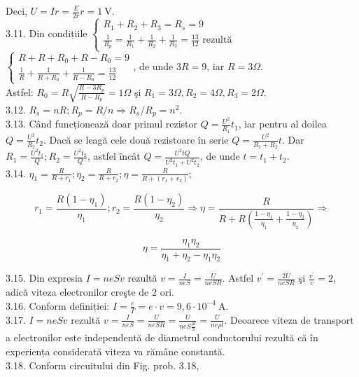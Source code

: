 Deci, $U=I r=\frac{E}{2 r} r=1 \mathrm{~V}$.\\
3.11. Din condițiile $\left\{\begin{array}{l}R_{1}+R_{2}+R_{3}=R_{s}=9 \\ \frac{1}{R_{p}}=\frac{1}{R_{1}}+\frac{1}{R_{2}}+\frac{1}{R_{3}}=\frac{13}{12} \text { rezultă }\end{array}\right.$ $\left\{\begin{array}{l}R+R+R_{0}+R-R_{0}=9 \\ \frac{1}{R}+\frac{1}{R+R_{0}}+\frac{1}{R-R_{0}}=\frac{13}{12}\end{array}\right.$, de unde $3 R=9$, iar $R=3 \Omega$.\\
Astfel: $R_{0}=R \sqrt{\frac{R-3 R_{p}}{R-R_{p}}}=1 \Omega$ şi $R_{1}=3 \Omega, R_{2}=4 \Omega, R_{3}=2 \Omega$.\\
3.12. $R_{s}=n R ; R_{p}=R / n \Rightarrow R_{s} / R_{p}=n^{2}$.\\
3.13. Când funcționează doar primul rezistor $Q=\frac{U^{2}}{R_{1}} t_{1}$, iar pentru al doilea $Q=\frac{U^{2}}{R_{2}} t_{2}$. Dacă se leagă cele două rezistoare în serie $Q=\frac{U^{2}}{R_{1}+R_{2}} t$. Dar $R_{1}=\frac{U^{2} t_{1}}{Q} ; R_{2}=\frac{U^{2} t_{2}}{Q}$, astfel încât $Q=\frac{U^{2} t Q}{U^{2} t_{1}+U^{2} t_{2}}$, de unde $t=t_{1}+t_{2}$.\\
3.14. $\eta_{1}=\frac{R}{R+r_{1}} ; \eta_{2}=\frac{R}{R+r_{2}} ; \eta=\frac{R}{R+\left(r_{1}+r_{2}\right)}$;

$$
r_{1}=\frac{R\left(1-\eta_{1}\right)}{\eta_{1}} ; r_{2}=\frac{R\left(1-\eta_{2}\right)}{\eta_{2}} \Rightarrow \eta=\frac{R}{R+R\left(\frac{1-\eta_{1}}{\eta_{1}}+\frac{1-\eta_{2}}{\eta_{2}}\right)} \Rightarrow
$$

$$
\eta=\frac{\eta_{1} \eta_{2}}{\eta_{1}+\eta_{2}-\eta_{1} \eta_{2}}
$$

3.15. Din expresia $I=n e S v$ rezultă $v=\frac{I}{n e S}=\frac{U}{n e S R}$. Astfel $v^{\prime}=\frac{2 U}{n e S R}$ şi $\frac{v^{\prime}}{v}=2$, adică viteza electronilor creşte de 2 ori.\\
3.16. Conform definiției: $I=\frac{e}{T}=e \cdot v=9,6 \cdot 10^{-4} \mathrm{~A}$.\\
3.17. $I=n e S v$ rezultă $v=\frac{I}{n e S}=\frac{U}{n e S R}=\frac{U}{n e S \frac{\rho l}{S}}=\frac{U}{n e \rho l}$. Deoarece viteza de transport a electronilor este independentă de diametrul conductorului rezultă că în experiența considerată viteza va rămâne constantă.\\
3.18. Conform circuitului din Fig. prob. 3.18,

